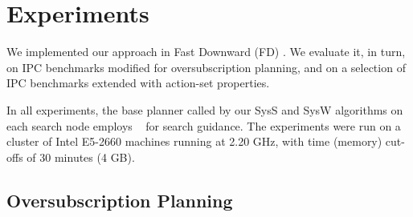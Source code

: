 

\newcommand{\scatterplotsize}{8cm}
\newcommand{\scatterplotxlabelshift}{1.5ex}
\newcommand{\scatterplotylabelshift}{-3ex}




\section{Experiments}
\label{experiments}

We implemented our approach in Fast Downward
(FD) \cite{helmert:jair-06}. We evaluate it, in turn, on IPC
benchmarks modified for oversubscription planning, and on a selection
of IPC benchmarks extended with action-set properties.

In all experiments, the base planner called by our SysS and SysW
algorithms on each search node
employs \hff\ \cite{hoffmann:nebel:jair-01} for search guidance.
%
%
The experiments were run on a cluster of Intel E5-2660 machines
running at 2.20 GHz, with time (memory) cut-offs of 30 minutes (4
GB).



 
\subsection{Oversubscription Planning}

%


